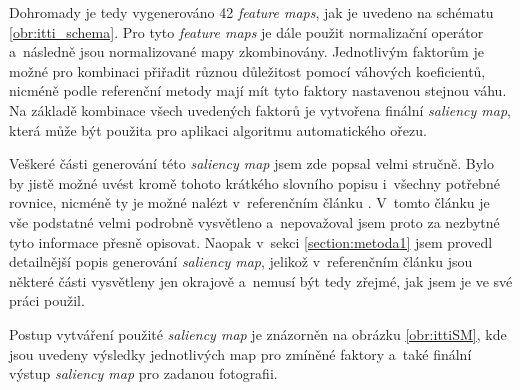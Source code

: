 Dohromady je tedy vygenerováno 42 \emph{feature maps}, jak je uvedeno na schématu \ref{obr:itti_schema}. Pro tyto \emph{feature maps} je dále použit normalizační operátor a~následně jsou normalizované mapy zkombinovány. Jednotlivým faktorům je možné pro kombinaci přiřadit různou důležitost pomocí váhových koeficientů, nicméně podle referenční metody mají mít tyto faktory nastavenou stejnou váhu. Na základě kombinace všech uvedených faktorů je vytvořena finální \emph{saliency map}, která může být použita pro aplikaci algoritmu automatického ořezu. 

Veškeré části generování této \emph{saliency map} jsem zde popsal velmi stručně. Bylo by jistě možné uvést kromě tohoto krátkého slovního popisu i~všechny potřebné rovnice, nicméně ty je možné nalézt v~referenčním článku \cite{Itti1998}. V~tomto článku je vše podstatné velmi podrobně vysvětleno a~nepovažoval jsem proto za nezbytné tyto informace přesně opisovat. Naopak v~sekci \ref{section:metoda1} jsem provedl detailnější popis generování \emph{saliency map}, jelikož v~referenčním článku \cite{Stentiford2007} jsou některé části vysvětleny jen okrajově a~nemusí být tedy zřejmé, jak jsem je ve své práci použil.

Postup vytváření použité \emph{saliency map} je znázorněn na obrázku \ref{obr:ittiSM}, kde jsou uvedeny výsledky jednotlivých map pro zmíněné faktory a~také finální výstup \emph{saliency map} pro zadanou fotografii.

